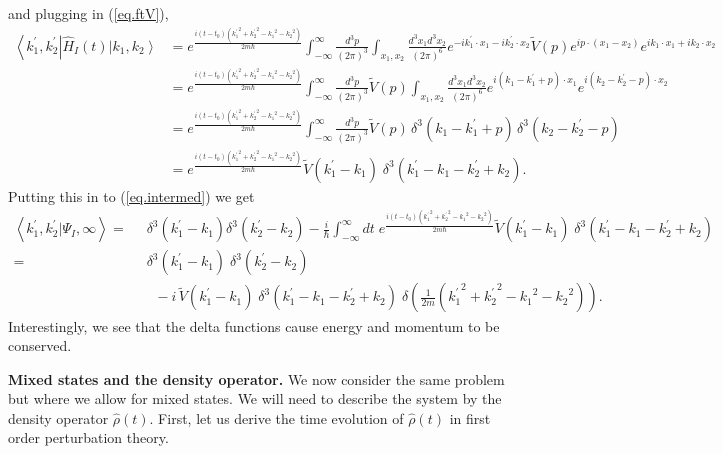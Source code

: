\documentclass[11pt]{article}
\newcommand{\bra}[1]{\left\langle#1\right|}
\newcommand{\ket}[1]{\left|#1\right\rangle}
\newcommand{\braket}[2]{\left\langle#1|#2\right\rangle}
\newcommand{\op}[1]{\hat{#1}}
\theoremstyle{theorem}
\theoremstyle{remark}
\theoremstyle{step}
\theoremstyle{gap}
\begin{document}
and plugging in (\ref{eq.ftV}),
\begin{align*}
\bra{k_1^\prime, k_2^\prime} \op{H}_I(t)\ket{k_1, k_2} 
&= e^{\frac{i\left(t-t_0\right)\left({k_1^\prime}^2 + {k_2^\prime}^2 - {k_1}^2 - {k_2}^2\right)}{2m\hbar}} \int_{-\infty}^{\infty} \frac{d^3p}{(2\pi)^3}\int_{x_1, x_2} \frac{d^3 x_1 d^3 x_2}{(2\pi)^6}e^{-ik_1^\prime\cdot x_1 - ik_2^\prime\cdot x_2}\widetilde{V}(p)e^{ip\cdot(x_1-x_2)} e^{ik_1\cdot x_1 + ik_2\cdot x_2} \\
&= e^{\frac{i\left(t-t_0\right)\left({k_1^\prime}^2 + {k_2^\prime}^2 - {k_1}^2 - {k_2}^2\right)}{2m\hbar}} \int_{-\infty}^{\infty} \frac{d^3p}{(2\pi)^3}\widetilde{V}(p) \int_{x_1, x_2} \frac{d^3 x_1 d^3 x_2}{(2\pi)^6}e^{i(k_1-k_1^\prime+p)\cdot x_1}e^{i(k_2-k_2^\prime-p)\cdot x_2}\\
&= e^{\frac{i\left(t-t_0\right)\left({k_1^\prime}^2 + {k_2^\prime}^2 - {k_1}^2 - {k_2}^2\right)}{2m\hbar}} \int_{-\infty}^{\infty} \frac{d^3p}{(2\pi)^3}\widetilde{V}(p) \,\delta^3(k_1-k_1^\prime+p)\,\delta^3(k_2-k_2^\prime-p)\\
&= e^{\frac{i\left(t-t_0\right)\left({k_1^\prime}^2 + {k_2^\prime}^2 - {k_1}^2 - {k_2}^2\right)}{2m\hbar}} \widetilde{V}(k_1^\prime-k_1) \;\delta^3(k_1^\prime-k_1-k_2^\prime+k_2).
\end{align*}
Putting this in to (\ref{eq.intermed}) we get
\begin{align}
\braket{k_1^\prime, k_2^\prime}{\Psi_I, \infty} =&\;\; \delta^3(k_1^\prime - k_1)\delta^3(k_2^\prime - k_2) - \frac{i}{\hbar} \int_{-\infty}^\infty dt\;e^{\frac{i\left(t-t_0\right)\left({k_1^\prime}^2 + {k_2^\prime}^2 - {k_1}^2 - {k_2}^2\right)}{2m\hbar}} \widetilde{V}(k_1^\prime-k_1) \;\delta^3(k_1^\prime-k_1-k_2^\prime+k_2) \nonumber\\
=& \;\;\delta^3(k_1^\prime - k_1)\;\delta^3(k_2^\prime - k_2) \nonumber\\&\;\;\;\;- {i}\, \widetilde{V}(k_1^\prime-k_1) \;\delta^3(k_1^\prime-k_1-k_2^\prime+k_2) \;\delta\left(\frac{1}{{2m}}\left({k_1^\prime}^2 + {k_2^\prime}^2 - {k_1}^2 - {k_2}^2\right)\right).
\end{align}
Interestingly, we see that the delta functions cause energy and momentum to be conserved.

{\bf Mixed states and the density operator.} We now consider the same problem but where we allow for mixed states. We will need to describe the system by the density operator \(\op{\rho}(t)\). First, let us derive the time evolution of \(\op{\rho}(t)\) in first order perturbation theory.
\end{document}
